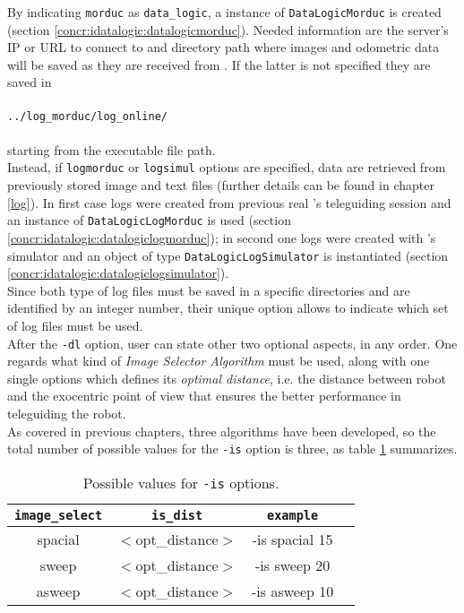 By indicating \texttt{morduc} as \texttt{data\_logic}, a instance
of \texttt{DataLogicMorduc} is created (section
\ref{concr:idatalogic:datalogicmorduc}). Needed information are
the server's IP or URL to connect to and directory path where images
and odometric data will be saved as they are received from \morduc{}.
If the latter is not specified they are saved in 
\\
\\
\texttt{../log\_morduc/log\_online/}
\\
\\
starting from the executable file path.
\\
Instead, if \texttt{logmorduc} or \texttt{logsimul} options are
specified, data are retrieved from previously stored image and text
files  (further details can be found in chapter \ref{log}).
In first case logs were created from previous real \morduc{}'s
teleguiding session and an instance of \texttt{DataLogicLogMorduc}
is used (section \ref{concr:idatalogic:datalogiclogmorduc});
in second one logs were created with \morduc{}'s simulator and
an object of type \texttt{DataLogicLogSimulator} is instantiated
(section \ref{concr:idatalogic:datalogiclogsimulator}).
\\
Since both type of log files must be saved in a specific directories and
are identified by an integer number, their unique option allows to indicate
which set of log files must be used.
\\
After the \texttt{-dl} option, user can state other two optional
aspects, in any order. One regards what kind of \textit{Image Selector
Algorithm} must be used, along with one single options which defines
its \textit{optimal distance}, i.e. the distance between robot and
the exocentric point of view that ensures the better performance in
teleguiding the robot.
\\
As covered in previous chapters, three algorithms have been developed,
so the total number of possible values for the \texttt{-is} option
is three, as table \ref{table:isoptions} summarizes.

\begin{table}[!h]
  \centering  
  \begin{tabular}{| c | c | c | c |}

    \hline
    \texttt{image\_select} &
    \texttt{is\_dist} &
    \texttt{example} \\

    \hline
    \small {spacial} &
    \small {$<$opt\_distance$>$} &
    \small{-is spacial 15} \\

    \hline
    \small {sweep} &
    \small {$<$opt\_distance$>$} &
    \small{-is sweep 20} \\

    \hline
    \small {asweep} &
    \small {$<$opt\_distance$>$} &
    \small{-is asweep 10} \\

    \hline

  \end{tabular}
  \caption{Possible values for \texttt{-is} options.}
  \label{table:isoptions}
\end{table}

